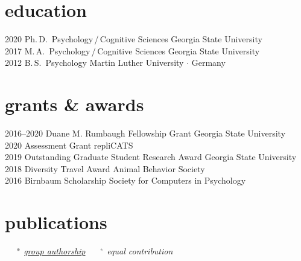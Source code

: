 \documentclass[]{friggeri-cv}
\begin{document}
\section{education}

\begin{entrylist}
  \entry
    {2020}
    {Ph.\,D.~Psychology\,/\,Cognitive Sciences}
    {Georgia State University}
    {\\[-.3cm]}
 \entry
   {2017}
   {M.\,A.~Psychology\,/\,Cognitive Sciences}
   {Georgia State University}
   {\\[-.3cm]}
  \entry
    {2012}
    {B.\,S.~Psychology}
    {Martin Luther University $\cdot$ Germany}
    {\\[-.3cm]}
\end{entrylist}


\section{grants \& awards}

\begin{entrylist}
  \entry
    {2016--2020}
    {Duane M. Rumbaugh Fellowship Grant}
    {Georgia State University}
    {\\[-.3cm]}
  \entry
    {2020}
    {Assessment Grant}
    {repliCATS}
    {\\[-.3cm]}
  \entry
    {2019}
    {Outstanding Graduate Student Research Award}
    {Georgia State University}
    {\\[-.3cm]}
  \entry
    {2018}
    {Diversity Travel Award}
    {Animal Behavior Society}
    {\\[-.3cm]}
  \entry
    {2016}
    {Birnbaum Scholarship}
    {Society for Computers in Psychology}
    {\\[-.3cm]}
\end{entrylist}



\section{publications}

\vspace{-.25cm}$\quad$
{\small{} $\color{lightgray} {}^\bullet$ \emph{\color{lightgray} \ul{group authorship}} $\quad$ %
{\normalsize $\color{lightgray} {}^\star$} \emph{\color{lightgray} equal contribution}}\\[.5cm]
\end{document}
